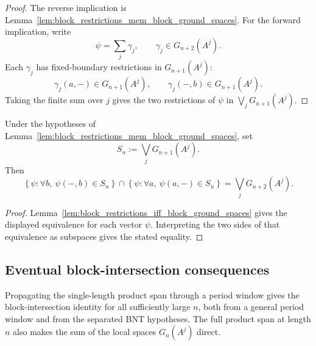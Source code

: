 \begin{proof}
    \leanok
    The reverse implication is
    Lemma~\ref{lem:block_restrictions_mem_block_ground_spaces}.  For the
    forward implication, write
    \[
        \psi=\sum_j\gamma_j,\qquad \gamma_j\in G_{n+2}(A^j).
    \]
    Each $\gamma_j$ has fixed-boundary restrictions in $G_{n+1}(A^j)$:
    \[
        \gamma_j(a,-)\in G_{n+1}(A^j),
        \qquad
        \gamma_j(-,b)\in G_{n+1}(A^j).
    \]
    Taking the finite sum over $j$ gives the two restrictions of $\psi$ in
    $\bigvee_jG_{n+1}(A^j)$.
\end{proof}

\begin{lemma}
    \label{lem:block_restriction_intersection_subspace}
    \leanok
    Under the hypotheses of
    Lemma~\ref{lem:block_restrictions_mem_block_ground_spaces}, set
    \[
        S_n:=\bigvee_jG_{n+1}(A^j).
    \]
    Then
    \[
        \left\{\psi:\forall b,\ \psi(-,b)\in S_n\right\}
        \cap
        \left\{\psi:\forall a,\ \psi(a,-)\in S_n\right\}
        =
        \bigvee_jG_{n+2}(A^j).
    \]
\end{lemma}

\begin{proof}
    \leanok
    Lemma~\ref{lem:block_restrictions_iff_block_ground_spaces} gives the
    displayed equivalence for each vector $\psi$.  Interpreting the two sides
    of that equivalence as subspaces gives the stated equality.
\end{proof}

\subsection{Eventual block-intersection consequences}\label{subsec:block_intersection_eventual}

Propagating the single-length product span through a period window gives the
block-intersection identity for all sufficiently large $n$, both from a general
period window and from the separated BNT hypotheses. The full product span at
length $n$ also makes the sum of the local spaces $G_n(A^j)$ direct.

